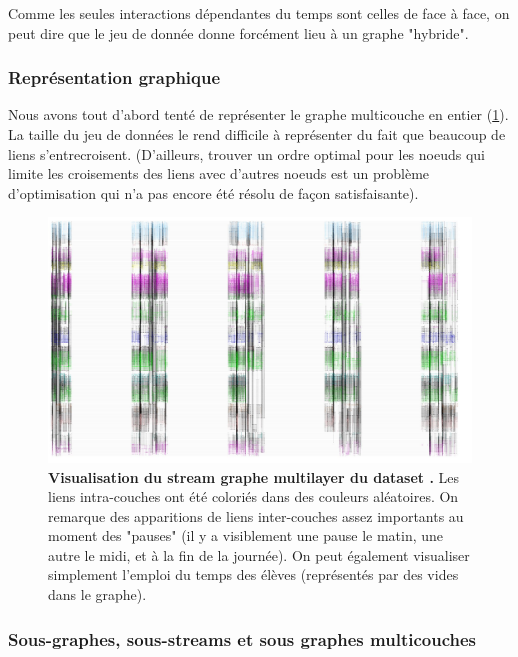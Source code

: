 \documentclass[11pt,a4paper]{article}
\theoremstyle{definition}
\theoremstyle{remark}
\theoremstyle{remark}
\begin{document}
  Comme les seules interactions dépendantes du temps sont celles de face à face, on peut dire que le jeu de donnée donne forcément lieu à un graphe "hybride".
  
	\subsubsection{Représentation graphique}  
  
  Nous avons tout d'abord tenté de représenter le graphe multicouche en entier (\cref{lyceeentier}). La taille du jeu de données le rend difficile à représenter du fait que beaucoup de liens s'entrecroisent. (D'ailleurs, trouver un ordre optimal pour les noeuds qui limite les croisements des liens avec d'autres noeuds est un problème d'optimisation qui n'a pas encore été résolu de façon satisfaisante).
	
	\begin{figure}[h]
	\includegraphics[width=\textwidth]{lyceeentier.JPG}
	\caption{\textbf{Visualisation du stream graphe multilayer du dataset \cite{cpge}.} Les liens intra-couches ont été coloriés dans des couleurs aléatoires. On remarque des apparitions de liens inter-couches assez importants au moment des "pauses" (il y a visiblement une pause le matin, une autre le midi, et à la fin de la journée). On peut également visualiser simplement l'emploi du temps des élèves (représentés par des vides dans le graphe).}
	\label{lyceeentier}
\end{figure}





\subsubsection{Sous-graphes, sous-streams et sous graphes multicouches}
\end{document}
